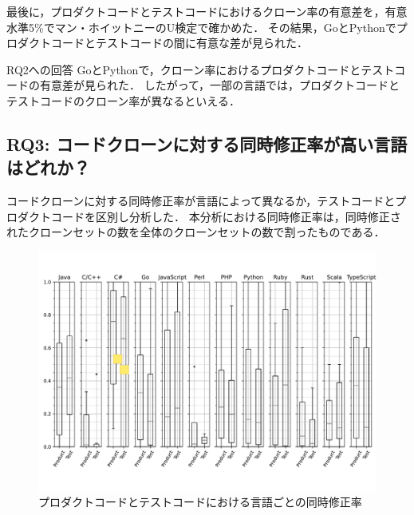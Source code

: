 \documentclass[T,J]{fose}
\begin{document}
最後に，プロダクトコードとテストコードにおけるクローン率の有意差を，有意水準5\%でマン・ホイットニーのU検定で確かめた．
その結果，GoとPythonでプロダクトコードとテストコードの間に有意な差が見られた．


\begin{itembox}[l]{RQ2への回答}
GoとPythonで，クローン率におけるプロダクトコードとテストコードの有意差が見られた．
したがって，一部の言語では，プロダクトコードとテストコードのクローン率が異なるといえる．
\end{itembox}


\subsection{RQ3: コードクローンに対する同時修正率が高い言語はどれか？}
コードクローンに対する同時修正率が言語によって異なるか，テストコードとプロダクトコードを区別し分析した．
本分析における同時修正率は，同時修正されたクローンセットの数を全体のクローンセットの数で割ったものである．


\begin{figure}[tb]
    \centering
    \includegraphics[width=\textwidth]{images/RQ3.pdf}
    \caption{プロダクトコードとテストコードにおける言語ごとの同時修正率}
    \label{fig:rateOfCoModifiedOfTestAndProduct}
\end{figure}
\end{document}
